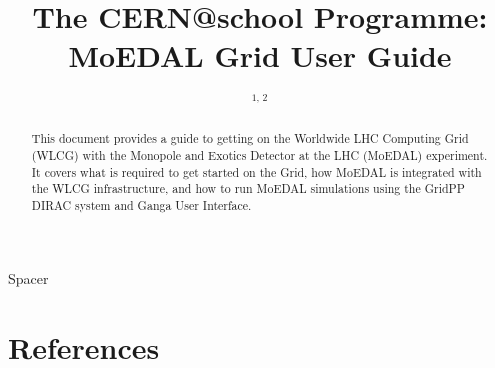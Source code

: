 \documentclass[12pt,a4paper]{iopart}
\begin{document}
%
%


\title{%
The CERN@school Programme:\\
MoEDAL Grid User Guide%
}
% 
\author{\theauthorinit$^{1, \, 2}$}
%
\address{$^1$\theauthoraddressA}
\address{$^2$\theauthoraddressB}
\ead{\mailto{\theauthoremail}}

\begin{abstract}
This document provides a guide to getting on the Worldwide LHC Computing Grid
(WLCG) with the Monopole and Exotics Detector at the LHC (MoEDAL)
experiment.
It covers what is required to get started on the Grid,
how MoEDAL is integrated with the WLCG infrastructure,
and how to run MoEDAL simulations using the GridPP DIRAC system and
Ganga User Interface.
\end{abstract}
%

{\color{white}Spacer}
\\[5cm]



\newpage

\setcounter{tocdepth}{2}
\tableofcontents

\newpage

%
%


\newpage



\newpage



\newpage






\newpage

%
%
\section{References}
\label{sec:references}


%
\end{document}

